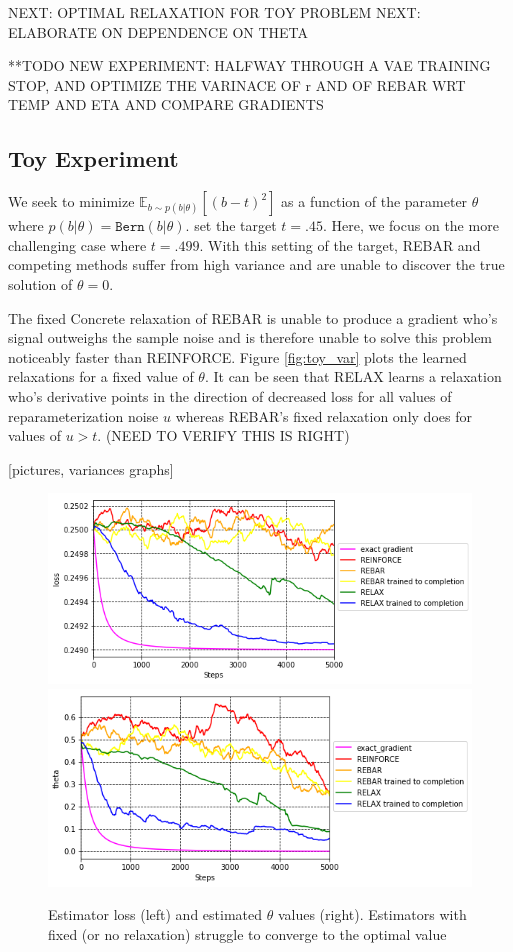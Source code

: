 \documentclass{article}
\newcommand{\relaxed}{r}
\begin{document}
NEXT: OPTIMAL RELAXATION FOR TOY PROBLEM
NEXT: ELABORATE ON DEPENDENCE ON THETA


**TODO NEW EXPERIMENT: HALFWAY THROUGH A VAE TRAINING STOP, AND OPTIMIZE THE VARINACE OF \relaxed{} AND OF REBAR WRT TEMP AND ETA AND COMPARE GRADIENTS

\subsection{Toy Experiment}
We seek to minimize $\mathbb{E}_{b \sim p(b|\theta)}[(b - t)^2]$ as a function of the parameter $\theta$ where $p(b|\theta) = \mathtt{Bern}(b|\theta)$. \cite{tucker2017rebar} set the target $t = .45$. Here, we focus on the more challenging case where $t = .499$. With this setting of the target, REBAR and competing methods suffer from high variance and are unable to discover the true solution of $\theta = 0$.

The fixed Concrete relaxation of REBAR is unable to produce a gradient who's signal outweighs the sample noise and is therefore unable to solve this problem noticeably faster than REINFORCE. Figure \ref{fig:toy_var} plots the learned relaxations for a fixed value of $\theta$. It can be seen that RELAX learns a relaxation who's derivative points in the direction of decreased loss for all values of reparameterization noise $u$ whereas REBAR's fixed relaxation  only does for values of $u > t$. (NEED TO VERIFY THIS IS RIGHT)

[pictures, variances graphs]
\begin{figure}
\begin{center}
\includegraphics[scale=.33]{figures/losses}
\includegraphics[scale=.33]{figures/theta}
\end{center}
\label{fig:toy_loss}
\caption{Estimator loss (left) and estimated $\theta$ values (right). Estimators with fixed (or no relaxation) struggle to converge to the optimal value}
\end{figure}
\end{document}
